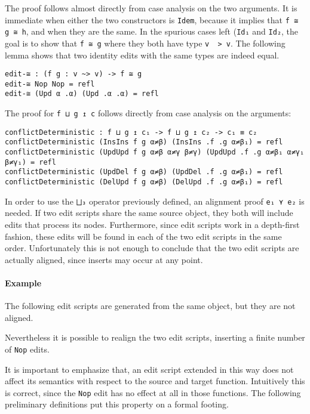 \documentclass[../Thesis.tex]{subfiles}
\begin{document}
	The proof follows almost directly from case analysis on the two arguments.
	It is immediate when either the two constructors is \texttt{Idem}, because
	it implies that \texttt{f ≅ g ≅ h}, and when they are the same.
	In the spurious cases left (\texttt{Id₁} and \texttt{Id₂}, the goal
	is to show that \texttt{f ≅ g} where they both have type \texttt{v ~> v}.
	The following lemma shows that two identity edits with the same types
	are indeed equal.
	
\begin{verbatim}
edit-≅ : (f g : v ~> v) -> f ≅ g
edit-≅ Nop Nop = refl
edit-≅ (Upd α .α) (Upd .α .α) = refl
\end{verbatim}	
	

	The proof for \texttt{f ⊔ g ↥ c} follows directly from case analysis on the 
	arguments:
	
\begin{verbatim}
conflictDeterministic : f ⊔ g ↥ c₁ -> f ⊔ g ↥ c₂ -> c₁ ≡ c₂
conflictDeterministic (InsIns f g α≠β) (InsIns .f .g α≠β₁) = refl
conflictDeterministic (UpdUpd f g α≠β α≠γ β≠γ) (UpdUpd .f .g α≠β₁ α≠γ₁ β≠γ₁) = refl
conflictDeterministic (UpdDel f g α≠β) (UpdDel .f .g α≠β₁) = refl
conflictDeterministic (DelUpd f g α≠β) (DelUpd .f .g α≠β₁) = refl
\end{verbatim}	


	In order to use the \texttt{⨆₃} operator previously defined, an alignment
	proof \texttt{e₁ ⋎ e₂} is needed.
	If two edit scripts share the same source object, they both will include 
	edits that process its nodes. Furthermore, since edit scripts work 
	in a depth-first fashion, these edits will be found in each 
	of the two edit scripts in the same order.
	Unfortunately this is not enough to conclude that the two edit scripts 
	are actually aligned, since inserts may occur at any point.
	
	\paragraph{Example}
	The following edit scripts are generated from the same object,
	but they are not aligned.
	
	Nevertheless it is possible to realign the two edit scripts, inserting
	a finite number of \texttt{Nop} edits.
	
	It is important to emphasize that, an edit script extended in this way
	does not affect its semantics with respect to the source and target function.
	Intuitively this is correct, since the \texttt{Nop} edit has no effect at all
	in those functions.
	The following preliminary definitions put this property on a formal footing.
\end{document}
